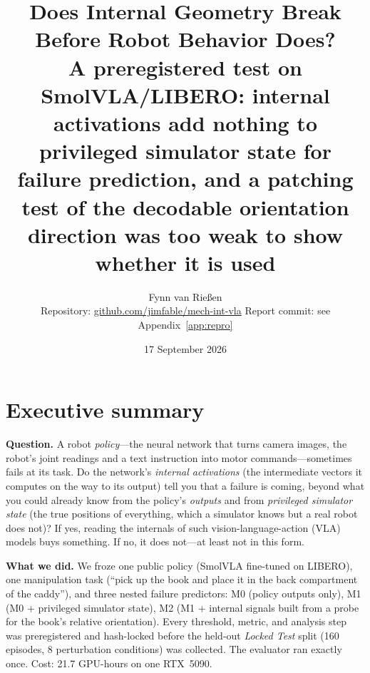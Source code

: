 \documentclass[11pt,a4paper]{article}
\title{\textbf{Does Internal Geometry Break Before Robot Behavior Does?}\\[4pt]
\large A preregistered test on SmolVLA/LIBERO: internal activations add nothing to privileged simulator state for failure prediction, and a patching test of the decodable orientation direction was too weak to show whether it is used}
\author{Fynn van Rießen\\[2pt]\small Repository: \href{https://github.com/jimfable/mech-int-vla}{github.com/jimfable/mech-int-vla} \quad Report commit: see Appendix~\ref{app:repro}}
\date{17 September 2026}
\newcommand{\Mz}{M0}\newcommand{\Mo}{M1}\newcommand{\Mt}{M2}
\begin{document}
\maketitle

\section*{Executive summary}

\textbf{Question.} A robot \emph{policy}---the neural network that turns camera images, the robot's joint readings and a text instruction into motor commands---sometimes fails at its task. Do the network's \emph{internal activations} (the intermediate vectors it computes on the way to its output) tell you that a failure is coming, beyond what you could already know from the policy's \emph{outputs} and from \emph{privileged simulator state} (the true positions of everything, which a simulator knows but a real robot does not)? If yes, reading the internals of such vision-language-action (VLA) models buys something. If no, it does not---at least not in this form.

\textbf{What we did.} We froze one public policy (SmolVLA fine-tuned on LIBERO), one manipulation task (``pick up the book and place it in the back compartment of the caddy''), and three nested failure predictors: \Mz{} (policy outputs only), \Mo{} (\Mz{} + privileged simulator state), \Mt{} (\Mo{} + internal signals built from a probe for the book's relative orientation). Every threshold, metric, and analysis step was preregistered and hash-locked before the held-out \emph{Locked Test} split (160 episodes, 8 perturbation conditions) was collected. The evaluator ran exactly once. Cost: 21.7 GPU-hours on one RTX~5090.
\end{document}
